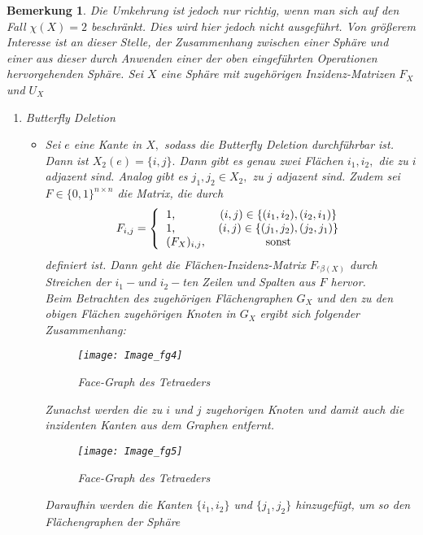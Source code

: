\documentclass[12pt,titlepage,twoside,cleardoublepage]{article}
\theoremstyle{nummermitklammern}
\newtheorem{bemerkung}[temp]{Bemerkung}
\newtheorem{bemerkung}[zahl]{Bemerkung}
\numberwithin{equation}{section}
\begin{document}
\begin{bemerkung}
Die Umkehrung ist jedoch nur richtig, wenn man sich auf den Fall $\chi(X)=2$ beschränkt.  Dies wird hier jedoch nicht ausgeführt. Von größerem Interesse ist an dieser Stelle, der Zusammenhang zwischen einer Sphäre und einer aus dieser durch Anwenden einer der oben eingeführten Operationen hervorgehenden Sphäre.  
Sei $X$ eine Sphäre mit zugehörigen Inzidenz-Matrizen $F_X$ und $U_X$
\begin{enumerate}
\item Butterfly Deletion
\begin{itemize}
\item Sei $e$ eine Kante in $X,$ sodass die Butterfly Deletion durchführbar ist. Dann ist $X_2(e)=\{i,j\}.$ Dann gibt es genau zwei Flächen $i_1,i_2,$ die zu $i$ adjazent sind. Analog gibt es $j_1,j_2\in X_2,$ zu $j$ adjazent sind. Zudem sei $F\in \{0,1\}^{n\times n}$ die Matrix, die durch
 \[
F_{i,j}=
\Biggl{\{\begin{tabular}[l]{lcr}
1,&\textcolor{black}{$(i,j)\in \{(i_1,i_2),(i_2,i_1)\}$} \\
1,&\textcolor{black}{$(i,j)\in \{(j_1,j_2),(j_2,j_1)\}$} \\
$(F_{X})_{i,j}$,& sonst\\
\end{tabular}}
\] definiert ist. Dann geht die Flächen-Inzidenz-Matrix $F_{{}^e\beta(X)}$  durch Streichen der $i_1-$und $i_2-$ten Zeilen und Spalten aus $F$ hervor.\\
Beim Betrachten des zugehörigen Flächengraphen $G_X$ und den zu den obigen Flächen zugehörigen Knoten in $G_X$ ergibt sich folgender Zusammenhang:
\begin{figure}[H]
\begin{center}
\texttt{[image: Image\_fg4]}
\end{center}
\caption{Face-Graph des Tetraeders}
\end{figure}
Zunachst werden die zu $i$ und $j$ zugehorigen Knoten und damit auch die inzidenten Kanten aus dem Graphen entfernt. 
\begin{figure}[H]
\begin{center}
\texttt{[image: Image\_fg5]}
\end{center}
\caption{Face-Graph des Tetraeders}
\end{figure}
Daraufhin werden die Kanten $\{i_1,i_2\}$ und $\{j_1,j_2\}$ hinzugefügt, um so den Flächengraphen der Sphäre 
\end{itemize}

\end{enumerate}
\end{bemerkung}
\end{document}
